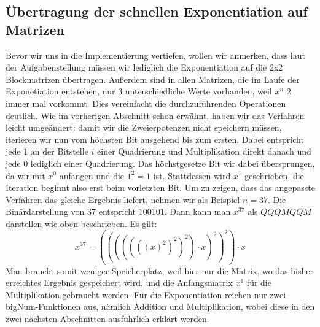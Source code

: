 \documentclass[course=erap]{aspdoc}
\begin{document}
\subsection{Übertragung der schnellen Exponentiation auf Matrizen}%
Bevor wir uns in die Implementierung vertiefen, wollen wir anmerken, dass laut der Aufgabenstellung müssen wir lediglich die Exponentiation auf die 2x2 Blockmatrizen übertragen. Außerdem sind in allen Matrizen, die im Laufe der Exponetiation entstehen, nur $3$ unterschiedliche Werte vorhanden, weil $x^n$ $2$ immer mal vorkommt. Dies vereinfacht die durchzuführenden Operationen deutlich. 
Wie im vorherigen Abschnitt schon erwähnt, haben wir das Verfahren leicht umgeändert: damit wir die Zweierpotenzen nicht speichern müssen, iterieren wir nun vom höchsten Bit ausgehend bis zum ersten. Dabei entspricht jede $1$ an der Bitstelle $i$ einer Quadrierung und Multiplikation direkt danach und jede $0$ lediglich einer Quadrierung. Das höchstgesetze Bit wir dabei übersprungen, da wir mit $x^0$ anfangen und die $1^2 = 1$ ist. Stattdessen wird $x^1$ geschrieben, die Iteration beginnt also erst beim vorletzten Bit.
Um zu zeigen, dass das angepasste Verfahren das gleiche Ergebnis liefert, nehmen wir als Beispiel $n = 37$. Die Binärdarstellung von $37$ entspricht $100101$. Dann kann man $x^{37}$ als $Q Q QM Q QM$ darstellen wie oben beschrieben. Es gilt:
\begin{equation}
    x^{37} = (((((((x)^2)^2)^2) \cdot x)^2)^2) \cdot x
\end{equation}
Man braucht somit weniger Speicherplatz, weil hier nur die Matrix, wo das bisher erreichtes Ergebnis gespeichert wird, und die Anfangsmatrix $x^1$ für die Multiplikation gebraucht werden.
Für die Exponentiation reichen nur zwei bigNum-Funktionen aus, nämlich Addition und Multiplikation, wobei diese in den zwei nächsten Abschnitten ausführlich erklärt werden.
\end{document}
